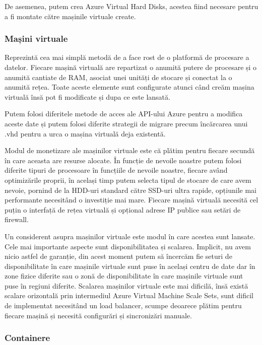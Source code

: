 De asemenea, putem crea Azure Virtual Hard Disks, acestea fiind necesare pentru a
fi montate către mașinile virtuale create.

\subsubsection{Mașini virtuale}

Reprezintă cea mai simplă metodă de a face rost de o platformă de procesare a datelor.
Fiecare mașină virtuală are repartizat o anumită putere de procesare și o anumită
cantiate de RAM, asociat unei unități de stocare și conectat la o anumită rețea.
Toate aceste elemente sunt configurate atunci când creăm mașina virtuală însă pot fi
modificate și dupa ce este lansată.

Putem folosi diferitele metode de acces ale API-ului Azure pentru a modifica aceste date
și putem folosi diferite strategii de migrare precum încărcarea unui .vhd pentru a urca
o mașina virtuală deja existentă.

Modul de monetizare ale mașinilor virtuale este că plătim pentru fiecare secundă
în care aceasta are resurse alocate. În funcție de nevoile noastre putem folosi
diferite tipuri de procesoare în funcțiile de nevoile noastre, fiecare având
optimizările proprii, în același timp putem selecta tipul de stocare de care avem nevoie,
pornind de la HDD-uri standard către SSD-uri ultra rapide, opțiunile mai performante
necesitând o investiție mai mare. Fiecare mașină virtuală necesită cel puțin
o interfață de rețea virtuală și opțional adrese IP publice sau setări de firewall.

Un considerent asupra mașinilor virtuale este modul în care acestea sunt lansate.
Cele mai importante aspecte sunt disponibilitatea și scalarea. Implicit, nu avem
nicio astfel de garanție, din acest moment putem să încercăm fie seturi de disponibilitate
în care mașinile virtuale sunt puse în același centru de date dar în zone fizice diferite
sau o zonă de disponibilitate în care mașinile virtuale sunt puse în regiuni diferite.
Scalarea mașinilor virtuale este mai dificilă, însă există scalare orizontală prin
intermediul Azure Virtual Machine Scale Sets, sunt dificil de implementat necesitând un load balancer, scumpe
deoarece plătim pentru fiecare mașină și necesită configurări și sincronizări manuale.

\subsubsection{Containere}

